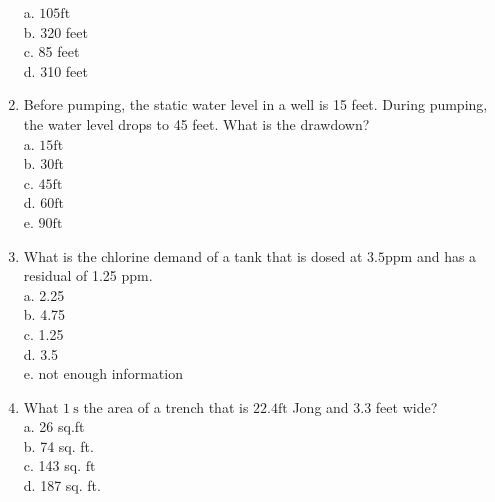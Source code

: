 \begin{enumerate}
a. $105 \mathrm{ft}$\\
b. 320 feet\\
c. 85 feet\\
d. 310 feet\\
\item Before pumping, the static water level in a well is 15 feet. During pumping, the water level drops to 45 feet. What is the drawdown?\\
a. $15 \mathrm{ft}$\\
b. $30 \mathrm{ft}$\\
c. $45 \mathrm{ft}$\\
d. $60 \mathrm{ft}$\\
e. $90 \mathrm{ft}$\\
\item What is the chlorine demand of a tank that is dosed at $3.5 \mathrm{ppm}$ and has a residual of 1.25 ppm.\\
a. 2.25\\
b. 4.75\\
c. 1.25\\
d. 3.5\\
e. not enough information\\
\item What $1 \mathrm{~s}$ the area of a trench that is $22.4 \mathrm{ft}$ Jong and 3.3 feet wide?\\
a. 26 sq.ft\\
b. 74 sq. ft.\\
c. 143 sq. $\mathrm{ft}$\\
d. 187 sq. ft. 


\end{enumerate}
